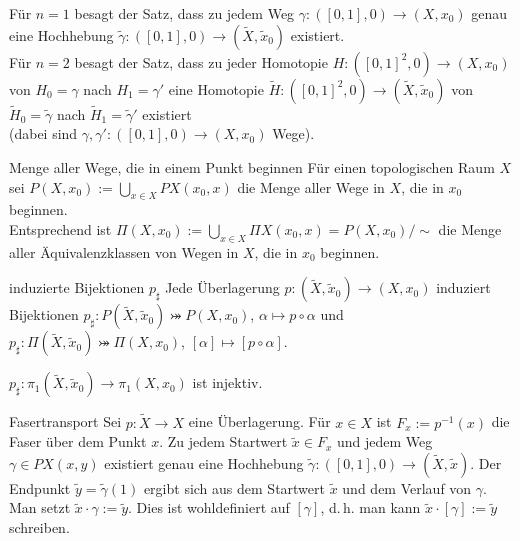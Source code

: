 \begin{Bem}
    Für $n = 1$ besagt der Satz, dass zu jedem Weg
    $\gamma\colon ([0, 1], 0) \rightarrow (X, x_0)$ genau eine Hochhebung
    $\widetilde{\gamma}\colon ([0, 1], 0) \rightarrow
    (\widetilde{X}, \widetilde{x}_0)$ existiert. \\
    Für $n = 2$ besagt der Satz, dass zu jeder Homotopie
    $H\colon ([0, 1]^2, 0) \rightarrow (X, x_0)$ von
    $H_0 = \gamma$ nach $H_1 = \gamma'$ eine Homotopie
    $\widetilde{H}\colon ([0, 1]^2, 0) \rightarrow
    (\widetilde{X}, \widetilde{x}_0)$ von
    $\widetilde{H}_0 = \widetilde{\gamma}$ nach
    $\widetilde{H}_1 = \widetilde{\gamma}'$ existiert \\
    (dabei sind $\gamma, \gamma'\colon ([0, 1], 0) \rightarrow (X, x_0)$ Wege).
\end{Bem}

\begin{Def}{Menge aller Wege, die in einem Punkt beginnen}
    Für einen topologischen Raum $X$ sei
    $P(X, x_0) := \bigcup_{x \in X} PX(x_0, x)$ die Menge aller Wege in $X$,
    die in $x_0$ beginnen. \\
    Entsprechend ist $\Pi(X, x_0) := \bigcup_{x \in X} \Pi X(x_0, x) =
    P(X, x_0)/\sim$ die Menge aller Äquivalenzklassen von Wegen in $X$,
    die in $x_0$ beginnen.
\end{Def}

\begin{Satz}{induzierte Bijektionen $p_\sharp$}
    Jede Überlagerung
    $p\colon (\widetilde{X}, \widetilde{x}_0) \rightarrow (X, x_0)$
    induziert Bijektionen
    $p_\sharp\colon P(\widetilde{X}, \widetilde{x}_0) \bij P(X, x_0)$,
    $\alpha \mapsto p \circ \alpha$ und
    $p_\sharp\colon \Pi(\widetilde{X}, \widetilde{x}_0) \bij \Pi(X, x_0)$,
    $[\alpha] \mapsto [p \circ \alpha]$.
\end{Satz}

\begin{Kor}
    $p_\sharp\colon \pi_1(\widetilde{X}, \widetilde{x}_0) \rightarrow
    \pi_1(X, x_0)$ ist injektiv.
\end{Kor}

\linie

\begin{Def}{Fasertransport}
    Sei $p\colon \widetilde{X} \rightarrow X$ eine Überlagerung.
    Für $x \in X$ ist $F_x := p^{-1}(x)$ die Faser über dem Punkt $x$.
    Zu jedem Startwert $\widetilde{x} \in F_x$ und jedem Weg
    $\gamma \in PX(x, y)$ existiert genau eine Hochhebung
    $\widetilde{\gamma}\colon ([0, 1], 0) \rightarrow
    (\widetilde{X}, \widetilde{x})$.
    Der Endpunkt $\widetilde{y} = \widetilde{\gamma}(1)$ ergibt sich aus
    dem Startwert $\widetilde{x}$ und dem Verlauf von $\gamma$.
    Man setzt $\widetilde{x} \cdot \gamma := \widetilde{y}$.
    Dies ist wohldefiniert auf $[\gamma]$, d.\,h. man kann
    $\widetilde{x} \cdot [\gamma] := \widetilde{y}$ schreiben.
\end{Def}

